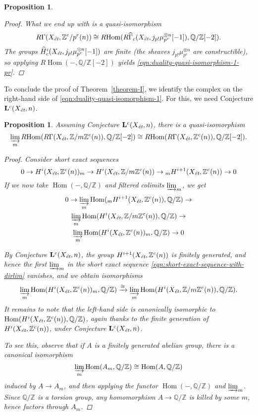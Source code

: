 \documentclass[leqno,12pt]{article}
\theoremstyle{plain}
\newtheorem{proposition}[theorem]{\indent\sc Proposition}
\theoremstyle{definition}
\DeclareMathOperator{\Hom}{Hom}
\newcommand{\QQ}{\mathbb{Q}}
\newcommand{\ZZ}{\mathbb{Z}}
\newcommand{\et}{\text{\it \'{e}t}}
\newcommand{\RHom}{R\!\Hom}
\begin{document}
\begin{proposition}
\begin{proof}
    What we end up with is a quasi-isomorphism
    \[ R\Gamma (X_\et, \ZZ^c/p^r (n)) \cong \RHom (R\widehat{\Gamma}_c (X_\et,
      j_{p !} \mu_{p^r}^{\otimes n} [-1]), \QQ/\ZZ [-2]). \]
    The groups $\widehat{H}^i_c (X_\et, j_{p!} \mu_{p^r}^{\otimes n} [-1])$ are
    finite (the sheaves $j_{p!} \mu_{p^r}^{\otimes n}$ are constructible),
    so applying $\RHom (-,\QQ/\ZZ [-2])$ yields
    \eqref{eqn:duality-quasi-isomorphism-1-pr}.
  \end{proof}
\end{proposition}

To conclude the proof of Theorem~\ref{theorem-I}, we identify the complex on the
right-hand side of \eqref{eqn:duality-quasi-isomorphism-1}. For this, we need
Conjecture $\mathbf{L}^c (X_\et, n)$.

\begin{proposition}
  Assuming Conjecture $\mathbf{L}^c (X_\et, n)$, there is
  a quasi-isomorphism
  \[ \varinjlim_m \RHom (R\Gamma (X_\et, \ZZ/m\ZZ^c (n)), \QQ/\ZZ [-2]) \cong
    \RHom (R\Gamma (X_\et, \ZZ^c (n)), \QQ/\ZZ [-2]). \]

  \begin{proof}
    Consider short exact sequences
    \[ 0 \to H^i (X_\et, \ZZ^c (n))_m \to
      H^i (X_\et, \ZZ/m\ZZ^c (n)) \to
      {}_m H^{i+1} (X_\et, \ZZ^c (n)) \to 0 \]
    If we now take $\Hom (-,\QQ/\ZZ)$ and filtered colimits $\varinjlim_m$,
    we get
    \begin{multline}
      \label{eqn:short-exact-sequence-with-dirlim}
      0 \to \varinjlim_m \Hom ({}_m H^{i+1} (X_\et, \ZZ^c (n)), \QQ/\ZZ) \to \\
      \varinjlim_m \Hom (H^i (X_\et, \ZZ/m\ZZ^c (n)), \QQ/\ZZ) \to \\
      \varinjlim_m \Hom (H^i (X_\et, \ZZ^c (n))_m, \QQ/\ZZ) \to 0
    \end{multline}

    By Conjecture $\mathbf{L}^c (X_\et, n)$, the group
    $H^{i+1} (X_\et, \ZZ^c (n))$ is finitely generated, and hence
    the first $\varinjlim_m$ in the short exact sequence
    \eqref{eqn:short-exact-sequence-with-dirlim} vanishes, and we obtain
    isomorphisms
    \[ \varinjlim_m \Hom (H^i (X_\et, \ZZ^c (n))_m, \QQ/\ZZ) \xrightarrow{\cong}
      \varinjlim_m \Hom (H^i (X_\et, \ZZ/m\ZZ^c (n)), \QQ/\ZZ). \]
    It remains to note that the left-hand side is canonically isomorphic to
    $\Hom (H^i (X_\et, \ZZ^c (n)), \QQ/\ZZ)$, again thanks to the finite
    generation of $H^i (X_\et, \ZZ^c (n))$, under Conjecture
    $\mathbf{L}^c (X_\et, n)$.

    To see this, observe that if $A$ is a finitely generated abelian group,
    there is a canonical isomorphism
    $$\varinjlim_m \Hom (A_m, \QQ/\ZZ) \cong \Hom (A, \QQ/\ZZ)$$
    induced by $A \to A_m$, and then applying the functor $\Hom (-, \QQ/\ZZ)$
    and $\varinjlim_m$. Since $\QQ/\ZZ$ is a torsion group, any homomorphism
    $A\to \QQ/\ZZ$ is killed by some $m$, hence factors through $A_m$.
  \end{proof}
\end{proposition}
\end{document}
